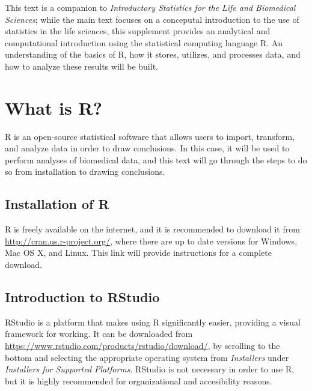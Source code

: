 \pagestyle{fancy}

This text is a companion to \textit{Introductory Statistics for the Life and Biomedical Sciences}; while the main text focuses on a conceputal introduction to the use of statistics in the life sciences, this supplement provides an analytical and computational introduction using the statistical computing language \textsf{R}.  An understanding of the basics of \textsf{R}, how it stores, utilizes, and processes data, and how to analyze these results will be built.  

\section{What is \textsf{R}?}
\textsf{R} is an open-source statistical software that allows users to import, transform, and analyze data in order to draw conclusions.  In this case, it will be used to perform analyses of biomedical data, and this text will go through the steps to do so from installation to drawing conclusions.  

\subsection{Installation of \textsf{R}}
\textsf{R} is freely available on the internet, and it is recommended to download it from \url{http://cran.us.r-project.org/}, where there are up to date versions for Windows, Mac OS X, and Linux.  This link will provide instructions for a complete download.  

\subsection{Introduction to RStudio}
\textsf{RStudio} is a platform that makes using \textsf{R} significantly easier, providing a visual framework for working. It can be downloaded from \url{https://www.rstudio.com/products/rstudio/download/}, by scrolling to the bottom and selecting the appropriate operating system from \textit{Installers} under \textit{Installers for Supported Platforms}.  \textsf{RStudio} is not necessary in order to use \textsf{R}, but it is highly recommended for organizational and accesibility reasons.      


